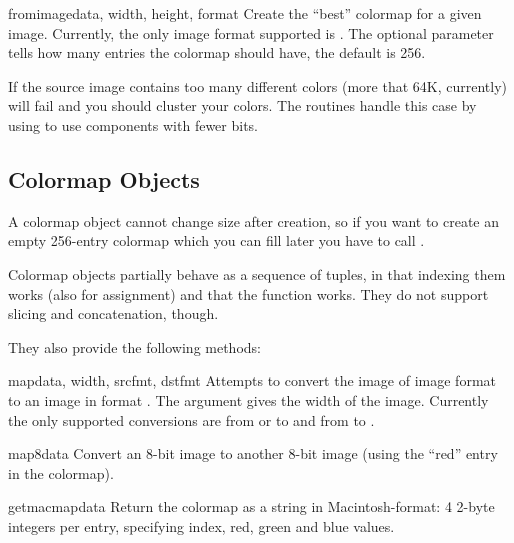 \begin{funcdesc}{fromimage}{data, width, height, format}
Create the ``best'' colormap for a given image. Currently, the only
image format supported is . The optional 
parameter tells how many entries the colormap should have, the default
is 256.

If the source image contains too many different colors (more that 64K,
currently)  will fail and you should cluster your
colors. The  routines handle this case by using
 to use components with fewer bits.
\end{funcdesc}

\subsection{Colormap Objects}
\label{colormap-objects}

A colormap object cannot change size after creation, so if you want to
create an empty 256-entry colormap which you can fill later you have
to call .

Colormap objects partially behave as a sequence of  tuples, in that indexing them works (also for assignment) and
that the  function works. They do not support slicing and
concatenation, though.

They also provide the following methods:

\begin{methoddesc}{map}{data, width, srcfmt, dstfmt}
Attempts to convert the image  of image format 
to an image in format . The  argument gives the
width of the image. Currently the only supported conversions are from
 or  to  and from  to
.
\end{methoddesc}

\begin{methoddesc}[colormap]{map8}{data}
Convert an 8-bit image to another 8-bit image (using the ``red'' entry
in the colormap).
\end{methoddesc}

\begin{methoddesc}[colormap]{getmacmapdata}{}
Return the colormap as a string in Macintosh-format: 4 2-byte integers
per entry, specifying index, red, green and blue values.
\end{methoddesc}

